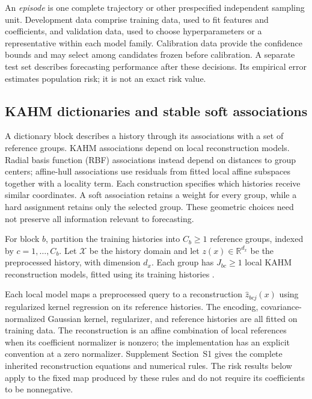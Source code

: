 An \emph{episode} is one complete trajectory or other prespecified independent
sampling unit. Development data comprise training data, used to fit features
and coefficients, and validation data, used to choose hyperparameters or a
representative within each model family. Calibration data provide the
confidence bounds and may select among candidates frozen before calibration.
A separate test set describes forecasting performance after these decisions.
Its empirical error estimates population risk; it is not an exact risk value.

\subsection{KAHM dictionaries and stable soft associations}

A dictionary block describes a history through its associations with a set of
reference groups. KAHM associations depend on local reconstruction models.
Radial basis function (RBF) associations instead depend on distances to group
centers; affine-hull associations use residuals from fitted local affine
subspaces together with a locality term. Each construction specifies which
histories receive similar coordinates. A soft association retains a weight for
every group, while a hard assignment retains only the selected group. These
geometric choices need not preserve all information relevant to forecasting.

For block $b$, partition the training histories into $C_b\geq1$ reference
groups, indexed by $c=1,\ldots,C_b$. Let $\mathcal X$ be the history domain
and let $z(x)\in\mathbb R^{d_x}$ be the preprocessed history, with dimension
$d_x$. Each group has $J_{bc}\geq1$ local KAHM reconstruction models, fitted
using its training histories
\citep{kumar2024kahm,kumar2025collaborative,kumar2026limits}.

Each local model maps a preprocessed query to a reconstruction
$\widehat z_{bcj}(x)$ using regularized kernel regression on its reference
histories. The encoding, covariance-normalized Gaussian kernel, regularizer,
and reference histories are all fitted on training data. The reconstruction is
an affine combination of local references when its coefficient normalizer is
nonzero; the implementation has an explicit convention at a zero normalizer.
Supplement Section~S1 gives the complete inherited reconstruction equations and
numerical rules. The risk results below apply to the fixed map produced by
these rules and do not require its coefficients to be nonnegative.

